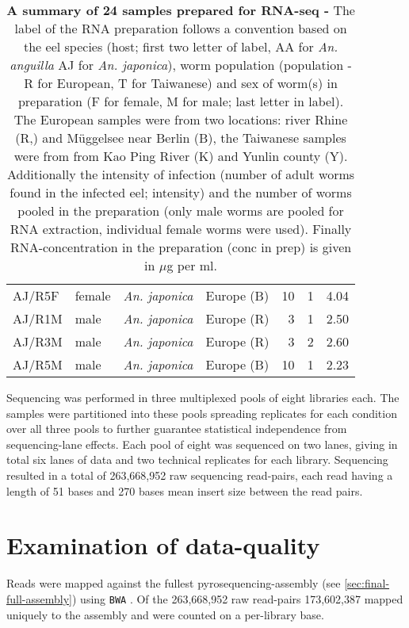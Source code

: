 \begin{table}[h]
\begin{center}
\begin{tabular}{llllrrr}
  AJ/R5F & female & \textit{An. japonica} & Europe (B) & 10 & 1 & 4.04 \\ 
  AJ/R1M & male & \textit{An. japonica} & Europe (R) & 3 & 1 & 2.50 \\ 
  AJ/R3M & male & \textit{An. japonica} & Europe (R) & 3 & 2 & 2.60 \\ 
  AJ/R5M & male & \textit{An. japonica} & Europe (B) & 10 & 1 & 2.23 \\ 
  \hline
\end{tabular}
\caption[Summary of RNA preparation]{\textbf{A summary of 24 samples
    prepared for RNA-seq -} The label of the RNA preparation follows a
  convention based on the eel species (host; first two letter of
  label, AA for \textit{An. anguilla} AJ for \textit{An. japonica}),
  worm population (population - R for European, T for Taiwanese) and
  sex of worm(s) in preparation (F for female, M for male; last letter
  in label). The European samples were from two locations: river Rhine
  (R,) and M\"uggelsee near Berlin (B), the Taiwanese samples were from
  from Kao Ping River (K) and Yunlin county (Y). Additionally the
  intensity of infection (number of adult worms found in the infected
  eel; intensity) and the number of worms pooled in the preparation
  (only male worms are pooled for RNA extraction, individual female
  worms were used). Finally RNA-concentration in the preparation (conc
  in prep) is given in $\mu$g per ml.}
\label{tab:lib-prep}
\end{center}
\end{table}


Sequencing was performed in three multiplexed pools of eight libraries
each. The samples were partitioned into these pools spreading
replicates for each condition over all three pools to further
guarantee statistical independence from sequencing-lane effects. Each
pool of eight was sequenced on two lanes, giving in total six lanes of
data and two technical replicates for each library. Sequencing
resulted in a total of 263,668,952 raw sequencing read-pairs, each
read having a length of 51 bases and 270 bases mean insert size
between the read pairs.

\section{Examination of data-quality}

Reads were mapped against the fullest pyrosequencing-assembly (see
\ref{sec:final-full-assembly}) using \texttt{BWA}
\cite{pmid20080505}. Of the 263,668,952 raw read-pairs 173,602,387
mapped uniquely to the assembly and were counted on a per-library
base. 

